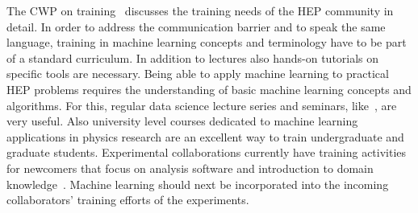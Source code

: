 The CWP on training~\cite{HSF-CWP-2017-02} discusses the training needs of the HEP community in detail.
In order to address the communication barrier and to speak the same language, training in machine learning concepts and terminology have to be part of a standard curriculum.
In addition to lectures also hands-on tutorials on specific tools are necessary.
Being able to apply machine learning to practical HEP problems requires the understanding of basic machine learning concepts and algorithms. For this, regular data science lecture series and seminars, like~\cite{mlhep}, are very useful. Also university level courses dedicated to machine learning applications in physics research are an excellent way to train undergraduate and graduate students.%
%
Experimental collaborations currently have training activities for newcomers that focus on analysis software and introduction to domain knowledge~\cite{2016chep.confE.334B}. Machine learning should next be incorporated into the incoming collaborators' training efforts of the experiments.
